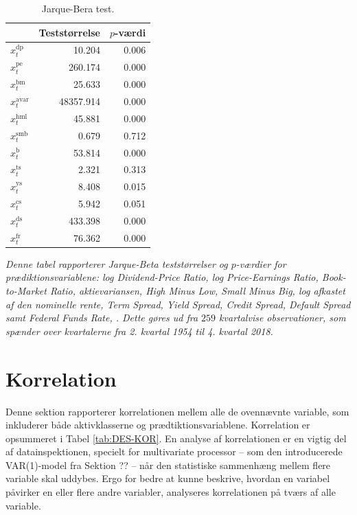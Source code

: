 \documentclass[
  a4paper,
  oneside]{memoir}
\begin{document}
\begin{table}[H]

\caption{\label{tab:JB-TILSTANDSVARIABLE}Jarque-Bera test.}
\centering
\begin{threeparttable}
\begin{tabular}[t]{lrr}
\toprule
  & Teststørrelse & $p$-værdi\\
\midrule
\rowcolor{gray!6}  $x_t^{\text{dp}}$ & 10.204 & 0.006\\
$x_t^{\text{pe}}$ & 260.174 & 0.000\\
\rowcolor{gray!6}  $x_t^{\text{bm}}$ & 25.633 & 0.000\\
$x_t^{\text{avar}}$ & 48357.914 & 0.000\\
\rowcolor{gray!6}  $x_t^{\text{hml}}$ & 45.881 & 0.000\\
$x_t^{\text{smb}}$ & 0.679 & 0.712\\
\rowcolor{gray!6}  $x_t^{\text{b}}$ & 53.814 & 0.000\\
$x_t^{\text{ts}}$ & 2.321 & 0.313\\
\rowcolor{gray!6}  $x_t^{\text{ys}}$ & 8.408 & 0.015\\
$x_t^{\text{cs}}$ & 5.942 & 0.051\\
\rowcolor{gray!6}  $x_t^{\text{ds}}$ & 433.398 & 0.000\\
$x_t^{\text{fr}}$ & 76.362 & 0.000\\
\bottomrule
\end{tabular}
\begin{tablenotes}
\item \textit{Denne tabel rapporterer Jarque-Beta teststørrelser og $p$-værdier for prædiktionsvariablene: log Dividend-Price Ratio, log Price-Earnings Ratio, Book-to-Market Ratio, aktievariansen, High Minus Low, Small Minus Big, log afkastet af den nominelle rente, Term Spread, Yield Spread, Credit Spread, Default Spread samt Federal Funds Rate, \citep{Jarque1980}. Dette gøres ud fra $259$ kvartalvise observationer, som spænder over kvartalerne fra 2. kvartal 1954 til 4. kvartal 2018.}
\end{tablenotes}
\end{threeparttable}
\end{table}

\hypertarget{korr}{%
\section{Korrelation}\label{korr}}

Denne sektion rapporterer korrelationen mellem alle de ovennævnte variable, som inkluderer både aktivklasserne og prædtiktionsvariablene. Korrelation er opsummeret i Tabel \ref{tab:DES-KOR}. En analyse af korrelationen er en vigtig del af datainspektionen, specielt for multivariate processor -- som den introducerede VAR(1)-model fra Sektion ?? -- når den statistiske sammenhæng mellem flere variable skal uddybes. Ergo for bedre at kunne beskrive, hvordan en variabel påvirker en eller flere andre variabler, analyseres korrelationen på tværs af alle variable.
\end{document}
